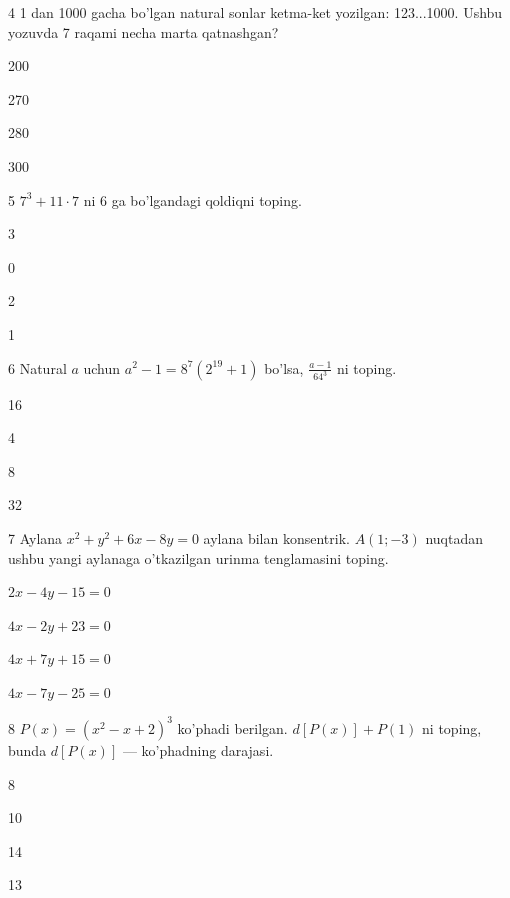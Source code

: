 \documentclass[14pt]{article}
\begin{document}
\begin{questionbox}{4}
    1 dan 1000 gacha bo'lgan natural sonlar ketma-ket yozilgan: 123...1000. Ushbu yozuvda 7 raqami necha marta qatnashgan?
    \begin{options}
        \item 200
        \item 270
        \item 280
        \item 300
    \end{options}
\end{questionbox}

\begin{questionbox}{5}
    \(7^3 + 11 \cdot 7\) ni 6 ga bo'lgandagi qoldiqni toping.
    \begin{options}
        \item 3
        \item 0
        \item 2
        \item 1
    \end{options}
\end{questionbox}

\begin{questionbox}{6}
    Natural \(a\) uchun \(a^2 - 1 = 8^7 (2^{19} + 1)\) bo'lsa, \(\frac{a-1}{64^3}\) ni toping.
    \begin{options}
        \item 16
        \item 4
        \item 8
        \item 32
    \end{options}
\end{questionbox}

\begin{questionbox}{7}
    Aylana \(x^2 + y^2 + 6x - 8y = 0\) aylana bilan konsentrik. \(A(1; -3)\) nuqtadan ushbu yangi aylanaga o'tkazilgan urinma tenglamasini toping.
    \begin{options}
        \item \(2x - 4y - 15 = 0\)
        \item \(4x - 2y + 23 = 0\)
        \item \(4x + 7y + 15 = 0\)
        \item \(4x - 7y - 25 = 0\)
    \end{options}
\end{questionbox}

\begin{questionbox}{8}
    \(P(x) = (x^2 - x + 2)^3\) ko'phadi berilgan. \(d[P(x)] + P(1)\) ni toping, bunda \(d[P(x)]\) — ko'phadning darajasi.
    \begin{options}
        \item 8
        \item 10
        \item 14
        \item 13
    \end{options}
\end{questionbox}
\end{document}
